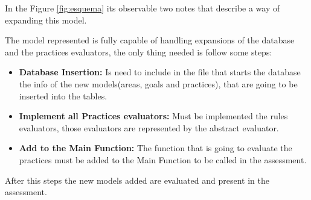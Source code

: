 In the Figure \ref{fig:esquema} its observable two notes that describe a way of expanding this model.

The model represented is fully capable of handling expansions of the database and the practices evaluators, the only thing needed is follow some steps:
\begin{itemize}
	\item \textbf{Database Insertion: } Is need to include in the file that starts the database the info of the new models(areas, goals and practices), that are going to be inserted into the tables.
	\item \textbf{Implement all Practices evaluators: } Must be implemented the rules evaluators, those evaluators are represented by the abstract evaluator.
	\item \textbf{Add to the Main Function: } The function that is going to evaluate the practices must be added to the Main Function to be called in the assessment.
\end{itemize}

After this steps the new models added are evaluated and present in the assessment.